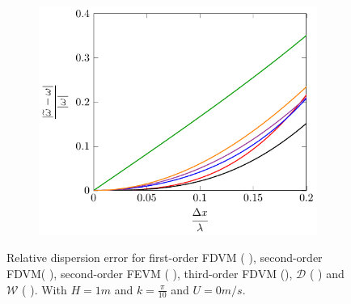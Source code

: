 \begin{figure}
\begin{subfigure}{0.5\textwidth}
		\includegraphics[width=\textwidth]{./chp4/figures/Dispu0khShallz.pdf}
	\end{subfigure}
	\caption{Relative dispersion error for first-order FDVM ({\color{green!60!black} \solidrule}), second-order FDVM({\color{red} \solidrule}), second-order FEVM ({\color{blue} \solidrule}), third-order FDVM ({\solidrule}), $\mathcal{D}$ ({\color{violet!80!white} \solidrule}) and $\mathcal{W}$ ({\color{orange} \solidrule}). With $H = 1m$  and $k = \frac{\pi}{10}$ and $U = 0 m/s$.}
	\label{fig:Dispu0Shall}
\end{figure}

